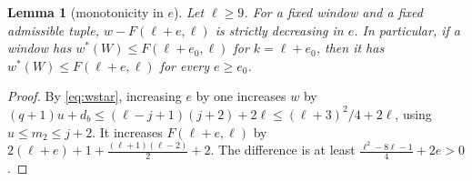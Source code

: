 \documentclass[11pt]{amsart}
\newtheorem{lemma}[theorem]{Lemma}
\theoremstyle{definition}
\newcommand{\F}{F}
\begin{document}
\begin{lemma}[monotonicity in $e$]\label{lem:mono}
Let $\ell\ge9$. For a fixed window and a fixed admissible tuple, $w-\F(\ell+e,\ell)$ is strictly decreasing in $e$. In particular, if a window has $w^*(W)\le\F(\ell+e_0,\ell)$ for $k=\ell+e_0$, then it has $w^*(W)\le\F(\ell+e,\ell)$ for every $e\ge e_0$.
\end{lemma}

\begin{proof}
By \eqref{eq:wstar}, increasing $e$ by one increases $w$ by $(q+1)u+d_b\le(\ell-j+1)(j+2)+2\ell\le(\ell+3)^2/4+2\ell$, using $u\le m_2\le j+2$. It increases $\F(\ell+e,\ell)$ by $2(\ell+e)+1+\frac{(\ell+1)(\ell-2)}2+2$. The difference is at least $\frac{\ell^2-8\ell-1}{4}+2e>0$.
\end{proof}
\end{document}
